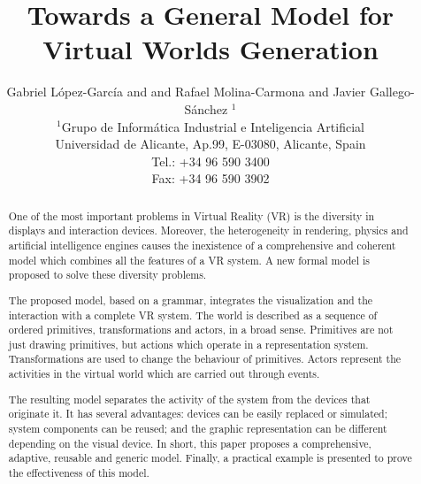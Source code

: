 \usepackage{amsmath,amssymb}
\usepackage{graphicx}
\usepackage{amsmath}
\usepackage{amssymb}
\usepackage{amsfonts}
\usepackage{textcomp}

\title{Towards a General Model for Virtual Worlds Generation}

\author[G. L\'opez-Garc\'ia \& Rafael Molina-Carmona \& Javier Gallego-S\'anchez]
       {Gabriel L\'opez-Garc\'ia and
        and Rafael Molina-Carmona
        and Javier Gallego-S\'anchez $^{1}$
        \\
		$^1$Grupo de Inform\'atica Industrial e Inteligencia Artificial\\
        Universidad de Alicante, Ap.99, E-03080, Alicante, Spain\\
        Tel.: +34 96 590 3400\\
        Fax:  +34 96 590 3902
       }



\maketitle

\begin{abstract}
One of the most important problems in Virtual Reality (VR) is the diversity in displays and interaction devices. Moreover, the heterogeneity in rendering, physics and artificial intelligence engines causes the inexistence of a comprehensive and coherent model which combines all the features of a VR system. A new formal model is proposed to solve these diversity problems.

The proposed model, based on a grammar, integrates the visualization and the interaction with a complete VR system. The world is described as a sequence of ordered primitives, transformations and actors, in a broad sense. Primitives are not just drawing primitives, but actions which operate in a representation system. Transformations are used to change the behaviour of primitives. Actors represent the activities in the virtual world which are carried out through events.

The resulting model separates the activity of the system from the devices that originate it. It has several advantages: devices can be easily replaced or simulated; system components can be reused; and the graphic representation can be different depending on the visual device. In short, this paper proposes a comprehensive, adaptive, reusable and generic model. Finally, a practical example is presented to prove the effectiveness of this model.

\begin{classification} %
\end{classification}

\end{abstract}

